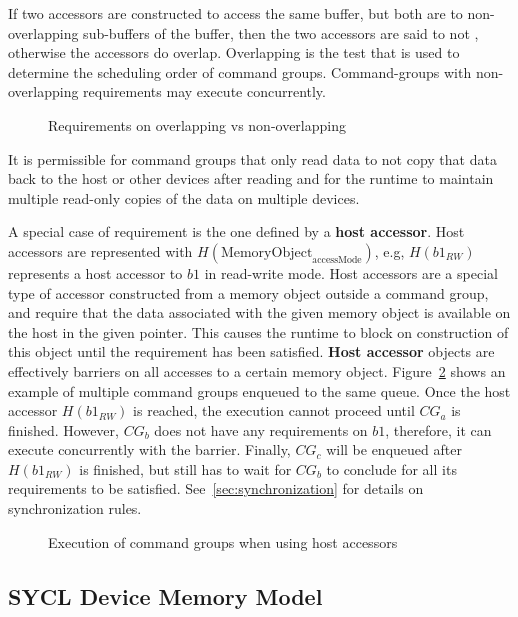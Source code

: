 If two accessors are constructed to
access the same buffer, but both are to non-overlapping sub-buffers of the
buffer, then the two accessors are said to not , otherwise the
accessors do overlap. Overlapping is the test that is used to determine the
scheduling order of command groups. 
Command-groups with non-overlapping requirements may execute concurrently.

\begin{figure}[h]
\centering

\caption{Requirements on overlapping vs non-overlapping }
\label{fig:overlap}
\end{figure}

It is permissible for command groups that only read data to not copy that data
back to the host or other devices after reading and for the runtime to maintain
multiple read-only copies of the data on multiple devices.

A special case of requirement is the one defined by a \textbf{host accessor}.
Host accessors are represented with $H(\text{MemoryObject}_{\text{accessMode}})$, e.g,
$H(b1_{RW})$ represents a host accessor to $b1$ in read-write mode.
Host accessors are a special type of accessor constructed from a memory
object outside a command group, and require that the data associated with
the given memory object is available on the host in the given pointer.
This causes the runtime to block on construction of this object until the
requirement has been satisfied. 
\textbf{Host accessor} objects are effectively barriers on all accesses to 
a certain memory object.
Figure~\ref{fig:host-acc} shows an example of multiple command groups
enqueued to the same queue. Once the host accessor $H(b1_{RW})$ is reached,
the execution cannot proceed until $CG_a$ is finished. 
However, $CG_b$ does not have any requirements on $b1$, therefore, it can
execute concurrently with the barrier.
Finally, $CG_c$ will be enqueued after $H(b1_{RW})$ is finished, 
but still has to wait for $CG_b$ to conclude for all its requirements to
be satisfied.
See~\ref{sec:synchronization} for details on synchronization rules.

\begin{figure}[h]
\centering

\caption{Execution of command groups when using host accessors}
\label{fig:host-acc}
\end{figure}

\subsection{SYCL Device Memory Model}

